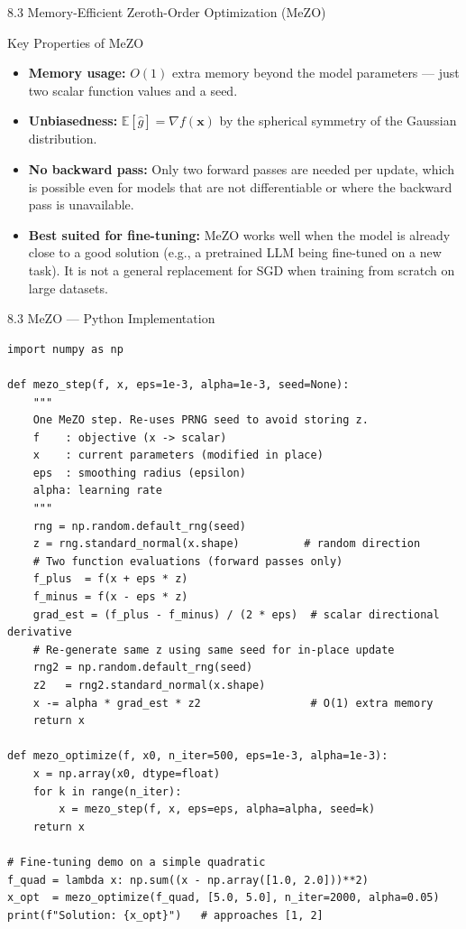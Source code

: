 \documentclass[aspectratio=169,10pt]{beamer}
\begin{document}
\begin{frame}[allowframebreaks]{8.3 Memory-Efficient Zeroth-Order Optimization (MeZO)}
\begin{block}{Key Properties of MeZO}
\begin{itemize}
  \item \textbf{Memory usage:} $O(1)$ extra memory beyond the model parameters --- just two scalar function values and a seed.
  \item \textbf{Unbiasedness:} $\mathbb{E}[\hat{g}] = \nabla f(\mathbf{x})$ by the spherical symmetry of the Gaussian distribution.
  \item \textbf{No backward pass:} Only two forward passes are needed per update, which is possible even for models that are not differentiable or where the backward pass is unavailable.
  \item \textbf{Best suited for fine-tuning:} MeZO works well when the model is already close to a good solution (e.g., a pretrained LLM being fine-tuned on a new task). It is not a general replacement for SGD when training from scratch on large datasets.
\end{itemize}
\end{block}

\end{frame}

\begin{frame}[fragile]{8.3 MeZO --- Python Implementation}
\begin{lstlisting}[caption={MeZO: memory-efficient zeroth-order optimisation (Algorithm 8.4)}]
import numpy as np

def mezo_step(f, x, eps=1e-3, alpha=1e-3, seed=None):
    """
    One MeZO step. Re-uses PRNG seed to avoid storing z.
    f    : objective (x -> scalar)
    x    : current parameters (modified in place)
    eps  : smoothing radius (epsilon)
    alpha: learning rate
    """
    rng = np.random.default_rng(seed)
    z = rng.standard_normal(x.shape)          # random direction
    # Two function evaluations (forward passes only)
    f_plus  = f(x + eps * z)
    f_minus = f(x - eps * z)
    grad_est = (f_plus - f_minus) / (2 * eps)  # scalar directional derivative
    # Re-generate same z using same seed for in-place update
    rng2 = np.random.default_rng(seed)
    z2   = rng2.standard_normal(x.shape)
    x -= alpha * grad_est * z2                 # O(1) extra memory
    return x

def mezo_optimize(f, x0, n_iter=500, eps=1e-3, alpha=1e-3):
    x = np.array(x0, dtype=float)
    for k in range(n_iter):
        x = mezo_step(f, x, eps=eps, alpha=alpha, seed=k)
    return x

# Fine-tuning demo on a simple quadratic
f_quad = lambda x: np.sum((x - np.array([1.0, 2.0]))**2)
x_opt  = mezo_optimize(f_quad, [5.0, 5.0], n_iter=2000, alpha=0.05)
print(f"Solution: {x_opt}")   # approaches [1, 2]
\end{lstlisting}
\end{frame}
\end{document}
